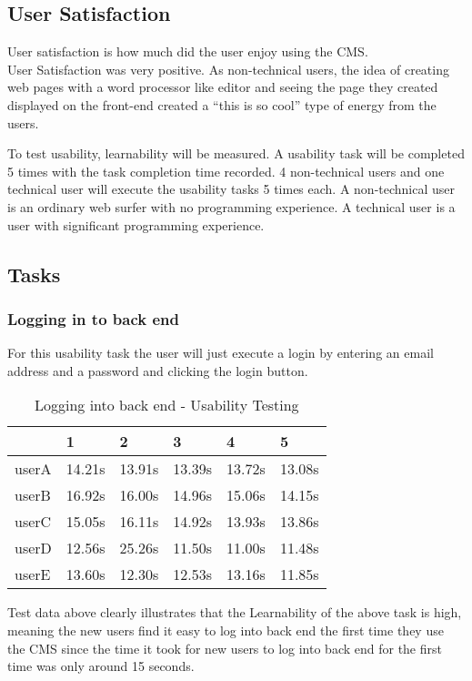 \documentclass[12pt]{article}
\begin{document}
\subsection{User Satisfaction}
User satisfaction is how much did the user enjoy using the CMS.\\
User Satisfaction was very positive. As non-technical users, the idea of creating web pages with a word processor like editor and seeing the page they created displayed on the front-end created a “this is so cool” type of energy from the users.
\par
To test usability, learnability will be measured. A usability task will be completed 5 times with the task completion time recorded. 4 non-technical users and one technical user will execute the usability tasks 5 times each. A non-technical user is an ordinary web surfer with no programming experience. A technical user is a user with significant programming experience.


\subsection{Tasks}
  \subsubsection{Logging in to back end}
  For this usability task the user will just execute a login by entering an email address and a password and clicking the login button.
  
  \begin{table}[H]
\centering
\caption{Logging into back end - Usability Testing}
\begin{tabular}{|l|l|l|l|l|l|}
\hline
      & 1      & 2      & 3      & 4      & 5      \\ \hline
userA & 14.21s & 13.91s & 13.39s & 13.72s & 13.08s \\ \hline
userB & 16.92s & 16.00s & 14.96s & 15.06s & 14.15s \\ \hline
userC & 15.05s & 16.11s & 14.92s & 13.93s & 13.86s \\ \hline
userD & 12.56s & 25.26s & 11.50s & 11.00s & 11.48s \\ \hline
userE & 13.60s & 12.30s & 12.53s & 13.16s & 11.85s \\ \hline
\end{tabular}
\end{table}

Test data above clearly illustrates that the Learnability of the above task is high, meaning the new users find it easy to log into back end the first time they use the CMS since the time it took for new users to log into back end for the first time was only around 15 seconds.
  
\end{document}
